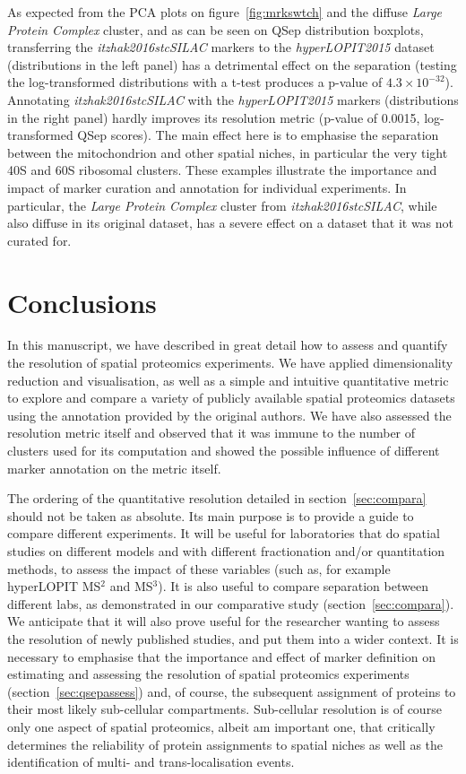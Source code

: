 \documentclass[12pt]{article}\usepackage[]{graphicx}\usepackage[]{color}
\begin{document}
As expected from the PCA plots on figure~\ref{fig:mrkswtch} and the
diffuse \textit{Large Protein Complex} cluster, and as can be seen on
QSep distribution boxplots, transferring the
\textit{itzhak2016stcSILAC} markers to the \textit{hyperLOPIT2015}
dataset (distributions in the left panel) has a detrimental effect on
the separation (testing the log-transformed distributions with a
t-test produces a p-value of \ensuremath{4.3\times 10^{-32}}). Annotating
\textit{itzhak2016stcSILAC} with the \textit{hyperLOPIT2015} markers
(distributions in the right panel) hardly improves its resolution
metric (p-value of 0.0015, log-transformed QSep
scores). The main effect here is to emphasise the separation between
the mitochondrion and other spatial niches, in particular the very
tight 40S and 60S ribosomal clusters. These examples illustrate the
importance and impact of marker curation and annotation for individual
experiments. In particular, the \textit{Large Protein Complex} cluster
from \textit{itzhak2016stcSILAC}, while also diffuse in its original
dataset, has a severe effect on a dataset that it was not curated for.

\section{Conclusions}

In this manuscript, we have described in great detail how to assess
and quantify the resolution of spatial proteomics experiments. We have
applied dimensionality reduction and visualisation, as well as a
simple and intuitive quantitative metric to explore and compare a
variety of publicly available spatial proteomics datasets using the
annotation provided by the original authors. We have also assessed the
resolution metric itself and observed that it was immune to the number
of clusters used for its computation and showed the possible influence
of different marker annotation on the metric itself.

The ordering of the quantitative resolution detailed in
section~\ref{sec:compara} should not be taken as absolute. Its main
purpose is to provide a guide to compare different experiments. It
will be useful for laboratories that do spatial studies on different
models and with different fractionation and/or quantitation methods,
to assess the impact of these variables (such as, for example
hyperLOPIT MS$^2$ and MS$^3$). It is also useful to compare separation
between different labs, as demonstrated in our comparative study
(section~\ref{sec:compara}). We anticipate that it will also prove
useful for the researcher wanting to assess the resolution of newly
published studies, and put them into a wider context. It is necessary
to emphasise that the importance and effect of marker definition on
estimating and assessing the resolution of spatial proteomics
experiments (section~\ref{sec:qsepassess}) and, of course, the
subsequent assignment of proteins to their most likely sub-cellular
compartments. Sub-cellular resolution is of course only one aspect of
spatial proteomics, albeit am important one, that critically
determines the reliability of protein assignments to spatial niches as
well as the identification of multi- and trans-localisation events.
\end{document}
